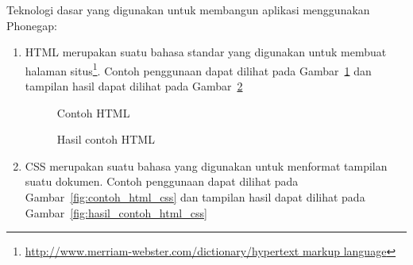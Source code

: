 Teknologi dasar yang digunakan untuk membangun aplikasi menggunakan Phonegap:
\begin{enumerate}
	\item HTML merupakan suatu bahasa standar yang digunakan untuk membuat halaman situs\footnote{\url{http://www.merriam-webster.com/dictionary/hypertext markup language}}. Contoh penggunaan dapat dilihat pada Gambar~\ref{fig:contoh_html} dan tampilan hasil dapat dilihat pada Gambar~\ref{fig:hasil_contoh_html}
		\begin{figure}[h]
		\centering
		\caption[Contoh HTML]{Contoh HTML} 
		\label{fig:contoh_html}
		\end{figure}
		\begin{figure}[h]
		\centering
		\caption[Hasil contoh HTML]{Hasil contoh HTML} 
		\label{fig:hasil_contoh_html}
		\end{figure}
	\item CSS merupakan suatu bahasa yang digunakan untuk menformat tampilan suatu dokumen. Contoh penggunaan dapat dilihat pada Gambar~\ref{fig:contoh_html_css} dan tampilan hasil dapat dilihat pada Gambar~\ref{fig:hasil_contoh_html_css}
		\begin{figure}[h]
		\centering
\end{figure}
\end{enumerate}
